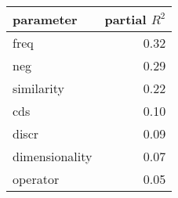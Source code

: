 \begin{tabular}{lr}
\toprule
      parameter &  partial $R^2$ \\
\midrule
           freq &       0.32 \\
            neg &       0.29 \\
     similarity &       0.22 \\
            cds &       0.10 \\
          discr &       0.09 \\
 dimensionality &       0.07 \\
       operator &       0.05 \\
\bottomrule
\end{tabular}

